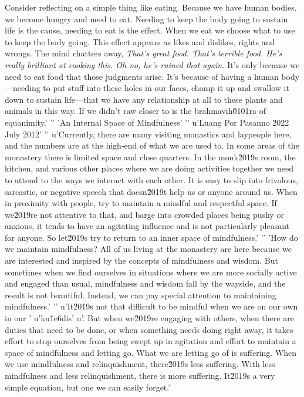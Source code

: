 Consider reflecting on a simple thing like eating. Because we have 
human bodies, we become hungry and need to eat. Needing to keep the 
body going to sustain life is the cause, needing to eat is the effect. 
When we eat we choose what to use to keep the body going. This effect 
appears as likes and dislikes, rights and wrongs. The mind chatters 
away, \emph{That's great food. That's terrible food. He's really 
brilliant at cooking this. Oh no, he's ruined that again.} It's only 
because we need to eat food that those judgments arise. It's because of 
having a human body---needing to put stuff into these holes in our 
faces, chomp it up and swallow it down to sustain life---that we have 
any relationship at all to these plants and animals in this way. If we 
didn't raw closer to is the brahmavih\u0101ra of equanimity.'
'\n'
'An Internal Space of Mindfulness'
'\n'
u'Luang Por Pasanno \u2022 July 2012'
'\n'
u'Currently, there are many visiting monastics and laypeople here, and the numbers are at the high-end of what we are used to. In some areas of the monastery there is limited space and close quarters. In the monk\u2019s room, the kitchen, and various other places where we are doing activities together we need to attend to the ways we interact with each other. It is easy to slip into frivolous, sarcastic, or negative speech that doesn\u2019t help us or anyone around us. When in proximity with people, try to maintain a mindful and respectful space. If we\u2019re not attentive to that, and barge into crowded places being pushy or anxious, it tends to have an agitating influence and is not particularly pleasant for anyone. So let\u2019s try to return to an inner space of mindfulness.'
'\n'
'How do we maintain mindfulness? All of us living at the monastery are here because we are interested and inspired by the concepts of mindfulness and wisdom. But sometimes when we find ourselves in situations where we are more socially active and engaged than usual, mindfulness and wisdom fall by the wayside, and the result is not beautiful. Instead, we can pay special attention to maintaining mindfulness.'
'\n'
u'It\u2019s not that difficult to be mindful when we are on our own in our '
u'ku\u1e6dis'
u'. But when we\u2019re engaging with others, when there are duties that need to be done, or when something needs doing right away, it takes effort to stop ourselves from being swept up in agitation and effort to maintain a space of mindfulness and letting go. What we are letting go of is suffering. When we use mindfulness and relinquishment, there\u2019s less suffering. With less mindfulness and less relinquishment, there is more suffering. It\u2019s a very simple equation, but one we can easily forget.'
